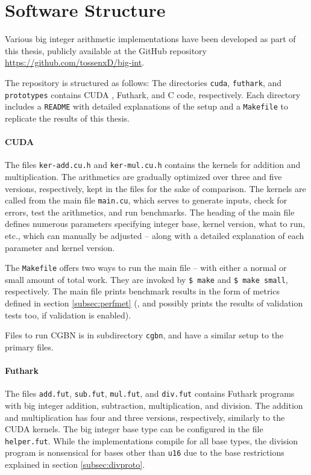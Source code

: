 \section{Software Structure}
\label{sec:software}

Various big integer arithmetic implementations have been developed as part of
this thesis, publicly available at the GitHub repository
\url{https://github.com/tossenxD/big-int}.

The repository is structured as follows: The directories \texttt{cuda},
\texttt{futhark}, and \texttt{prototypes} contains CUDA \cpp, Futhark, and C
code, respectively. Each directory includes a \texttt{README} with detailed
explanations of the setup and a \texttt{Makefile} to replicate the results of
this thesis.

\paragraph{CUDA \cpp}
The files \texttt{ker-add.cu.h} and \texttt{ker-mul.cu.h} contains the kernels
for addition and multiplication. The arithmetics are gradually optimized over
three and five versions, respectively, kept in the files for the sake of
comparison. The kernels are called from the main file \texttt{main.cu}, which
serves to generate inputs, check for errors, test the arithmetics, and run
benchmarks. The heading of the main file defines numerous parameters specifying
integer base, kernel version, what to run, etc., which can manually be adjusted
-- along with a detailed explanation of each parameter and kernel version.

The \texttt{Makefile} offers two ways to run the main file -- with either a
normal or small amount of total work. They are invoked by \texttt{\$ make} and
\texttt{\$ make small}, respectively. The main file prints benchmark results in
the form of metrics defined in section \ref{subsec:perfmet} (, and possibly
prints the results of validation tests too, if validation is enabled).

Files to run CGBN is in subdirectory \texttt{cgbn}, and have a similar setup to
the primary files.

\paragraph{Futhark}
The files \texttt{add.fut}, \texttt{sub.fut}, \texttt{mul.fut}, and
\texttt{div.fut} contains Futhark programs with big integer addition,
subtraction, multiplication, and division. The addition and multiplication has
four and three versions, respectively, similarly to the CUDA kernels. The big
integer base type can be configured in the file \texttt{helper.fut}. While the
implementations compile for all base types, the division program is nonsensical
for bases other than \texttt{u16} due to the base restrictions explained in
section \ref{subsec:divproto}.

